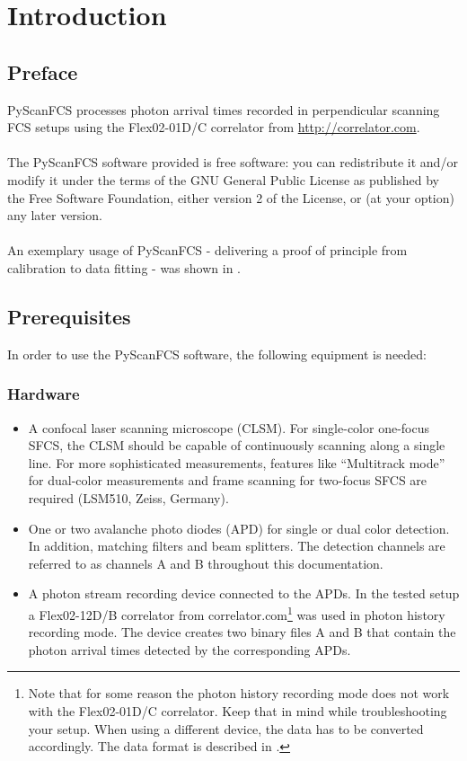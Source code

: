 
\section{Introduction}

\subsection{Preface}
PyScanFCS processes photon arrival times recorded in perpendicular scanning FCS setups using the Flex02-01D/C correlator from \url{http://correlator.com}.
\\
\\
The PyScanFCS software provided is free software: you can redistribute it and/or modify it
under the terms of the GNU General Public License as published 
by the Free Software Foundation, either version 2 of the License, 
or (at your option) any later version.
\\
\\
An exemplary usage of PyScanFCS - delivering a proof of principle from calibration to data fitting - was shown in \cite{Mueller2014}.

\subsection{Prerequisites}
In order to use the PyScanFCS software, the following equipment is needed:

\subsubsection*{Hardware}
\begin{itemize}
\item A confocal laser scanning microscope (CLSM). For single-color one-focus SFCS, the CLSM should be capable of continuously scanning along a single line. For more sophisticated measurements, features like ``Multitrack mode'' for dual-color measurements and frame scanning for two-focus SFCS are required (LSM510, Zeiss, Germany).

\item One or two avalanche photo diodes (APD) for single or dual color detection. In addition, matching filters and beam splitters. The detection channels are referred to as channels A and B throughout this documentation.

\item A photon stream recording device connected to the APDs. In the tested setup a Flex02-12D/B correlator from correlator.com\footnote{Note that for some reason the photon history recording mode does not work with the Flex02-01D/C correlator. Keep that in mind while troubleshooting your setup. When using a different device, the data has to be converted accordingly. The data format is described in .} was used in photon history recording mode. The device creates two binary files A and B that contain the photon arrival times detected by the corresponding APDs.
\end{itemize}

